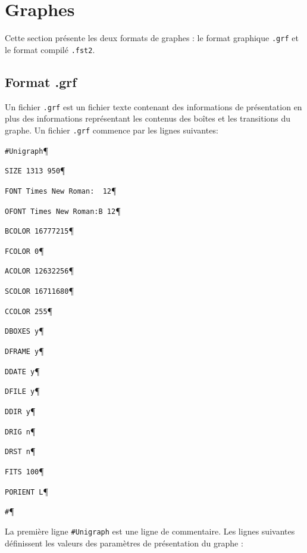 \section{Graphes}
Cette section présente les deux formats de graphes : le format graphique \verb+.grf+
et le format compilé \verb+.fst2+.


\subsection{Format .grf}
Un fichier \verb+.grf+ est un fichier texte contenant des informations de présentation en plus
des informations représentant les contenus des boîtes et les transitions du graphe. Un fichier
 \verb+.grf+ commence par les lignes suivantes:

\bigskip
\verb+#Unigraph+\P

\verb+SIZE 1313 950+\P

\verb+FONT Times New Roman:  12+\P

\verb+OFONT Times New Roman:B 12+\P

\verb+BCOLOR 16777215+\P

\verb+FCOLOR 0+\P

\verb+ACOLOR 12632256+\P

\verb+SCOLOR 16711680+\P

\verb+CCOLOR 255+\P

\verb+DBOXES y+\P

\verb+DFRAME y+\P

\verb+DDATE y+\P

\verb+DFILE y+\P

\verb+DDIR y+\P

\verb+DRIG n+\P

\verb+DRST n+\P

\verb+FITS 100+\P

\verb+PORIENT L+\P

\verb+#+\P

\bigskip
\noindent La première ligne \verb+#Unigraph+ est une ligne de commentaire. Les lignes suivantes définissent les valeurs des paramètres de présentation du graphe :


